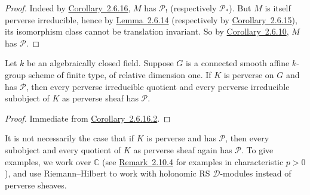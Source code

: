 \begin{proof}
Indeed by \hyperref[cor:2.6.16]{Corollary~2.6.16}, \(M\) has \(\mathcal{P}_!\) (respectively
\(\mathcal{P}_*\)). But \(M\) is itself perverse irreducible, hence by \hyperref[lem:2.6.14]{Lemma~2.6.14}
(respectively by \hyperref[cor:2.6.15]{Corollary~2.6.15}), its isomorphism class cannot be translation
invariant. So by \hyperref[cor:2.6.10]{Corollary~2.6.10}, \(M\) has \(\mathcal{P}\).
\end{proof}

Let \(k\) be an algebraically closed field. Suppose \(G\) is a connected smooth
affine \(k\)-group scheme of finite type, of relative dimension one. If \(K\)
is perverse on \(G\) and has \(\mathcal{P}\), then every perverse irreducible
quotient and every perverse irreducible subobject of \(K\) as perverse sheaf
has \(\mathcal{P}\).

\begin{proof}
Immediate from \hyperref[cor:2.6.16.2]{Corollary~2.6.16.2}.
\end{proof}

It is not necessarily the case that if \(K\) is perverse and has
\(\mathcal{P}\), then every subobject and every quotient of \(K\) as perverse
sheaf again has \(\mathcal{P}\). To give examples, we work over \(\mathbb{C}\)
(see \hyperref[rem:2.10.4]{Remark~2.10.4} for examples in characteristic \(p>0\)), and use
Riemann--Hilbert to work with holonomic RS \(\mathcal{D}\)-modules instead of
perverse sheaves.

